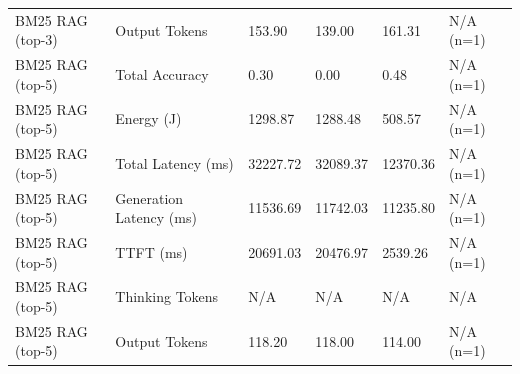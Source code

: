 \begin{table}
\begin{tabular}{llllll}
BM25 RAG (top-3) & Output Tokens & 153.90 & 139.00 & 161.31 & N/A (n=1) \\
BM25 RAG (top-5) & Total Accuracy & 0.30 & 0.00 & 0.48 & N/A (n=1) \\
BM25 RAG (top-5) & Energy (J) & 1298.87 & 1288.48 & 508.57 & N/A (n=1) \\
BM25 RAG (top-5) & Total Latency (ms) & 32227.72 & 32089.37 & 12370.36 & N/A (n=1) \\
BM25 RAG (top-5) & Generation Latency (ms) & 11536.69 & 11742.03 & 11235.80 & N/A (n=1) \\
BM25 RAG (top-5) & TTFT (ms) & 20691.03 & 20476.97 & 2539.26 & N/A (n=1) \\
BM25 RAG (top-5) & Thinking Tokens & N/A & N/A & N/A & N/A \\
BM25 RAG (top-5) & Output Tokens & 118.20 & 118.00 & 114.00 & N/A (n=1) \\
\bottomrule
\end{tabular}
\end{table}
